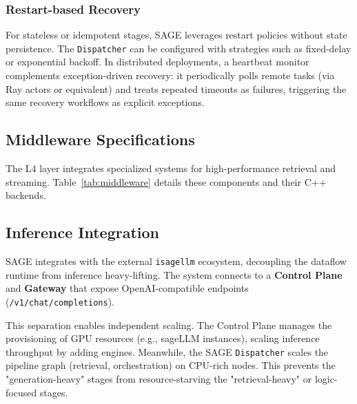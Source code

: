 \subsubsection{Restart-based Recovery}
For stateless or idempotent stages, SAGE leverages restart policies without state persistence. The \texttt{Dispatcher} can be configured with strategies such as fixed-delay or exponential backoff. In distributed deployments, a heartbeat monitor complements exception-driven recovery: it periodically polls remote tasks (via Ray actors or equivalent) and treats repeated timeouts as failures, triggering the same recovery workflows as explicit exceptions.

\subsection{Middleware Specifications}
\label{subsec:app_middleware}
The L4 layer integrates specialized systems for high-performance retrieval and streaming. Table~\ref{tab:middleware} details these components and their C++ backends.

\begin{table}[h]
\centering
\caption{Middleware Operators and Backends}
\label{tab:middleware}
\end{table}

\subsection{Inference Integration}
\label{subsec:app_inference}
SAGE integrates with the external \texttt{isagellm} ecosystem, decoupling the dataflow runtime from inference heavy-lifting. The system connects to a \textbf{Control Plane} and \textbf{Gateway} that expose OpenAI-compatible endpoints (\texttt{/v1/chat/completions}).

This separation enables independent scaling. The Control Plane manages the provisioning of GPU resources (e.g., sageLLM instances), scaling inference throughput by adding engines. Meanwhile, the SAGE \texttt{Dispatcher} scales the pipeline graph (retrieval, orchestration) on CPU-rich nodes. This prevents the "generation-heavy" stages from resource-starving the "retrieval-heavy" or logic-focused stages.
